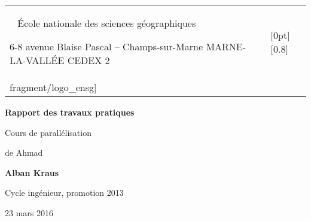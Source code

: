 \newlength\ensg
\settowidth{}

\begin{titlepage}

  \AddToShipoutPicture*{\BackgroundPic}

  \begin{flushright}
    \begin{tabular}{p{\ensg} p{}}
      {%
      \small
      ~\newline
      École nationale des sciences géographiques\newline
      
      6-8 avenue Blaise Pascal -- Champs-sur-Marne\newline
      77455 MARNE-LA-VALLÉE CEDEX 2
      } & \raisebox{-0.9\height}[0pt][0.8\height]{%
          \texttt{[image: \\fragment/logo\_ensg]}%
          } \\
    \end{tabular}
  \end{flushright}

  \begin{center}
    \textheight

    \begin{framed}
      \bigskip

      \Huge\sffamily\bfseries
      Rapport des travaux pratiques
      
      \bigskip

      \LARGE\rmfamily\mdseries
      Cours de parallélisation

      de Ahmad 

      \bigskip
    \end{framed}

    \textheight

    \bfseries\Large
    Alban Kraus
    
    \smallskip

    \normalsize\mdseries
    Cycle ingénieur, promotion 2013

    \textheight

    23 mars 2016
  \end{center}
\end{titlepage}


